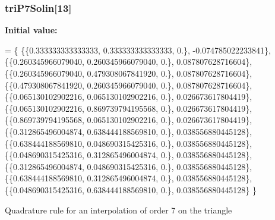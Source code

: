 \subsubsection[{tri\-P7\-Solin}]{ tri\-P7\-Solin[13]}\label{GaussQuadratureTri_8cc_a5b268edddb0d46913735af4b6360c51d}
{\bfseries Initial value\-:}
\begin{DoxyCode}
= \{
  \{\{0.333333333333333, 0.333333333333333, 0.\}, -0.074785022233841\},
  \{\{0.260345966079040, 0.260345966079040, 0.\}, 0.087807628716604\},
  \{\{0.260345966079040, 0.479308067841920, 0.\}, 0.087807628716604\},
  \{\{0.479308067841920, 0.260345966079040, 0.\}, 0.087807628716604\},
  \{\{0.065130102902216, 0.065130102902216, 0.\}, 0.026673617804419\},
  \{\{0.065130102902216, 0.869739794195568, 0.\}, 0.026673617804419\},
  \{\{0.869739794195568, 0.065130102902216, 0.\}, 0.026673617804419\},
  \{\{0.312865496004874, 0.638444188569810, 0.\}, 0.038556880445128\},
  \{\{0.638444188569810, 0.048690315425316, 0.\}, 0.038556880445128\},
  \{\{0.048690315425316, 0.312865496004874, 0.\}, 0.038556880445128\},
  \{\{0.312865496004874, 0.048690315425316, 0.\}, 0.038556880445128\},
  \{\{0.638444188569810, 0.312865496004874, 0.\}, 0.038556880445128\},
  \{\{0.048690315425316, 0.638444188569810, 0.\}, 0.038556880445128\}
\}
\end{DoxyCode}
Quadrature rule for an interpolation of order 7 on the triangle 
